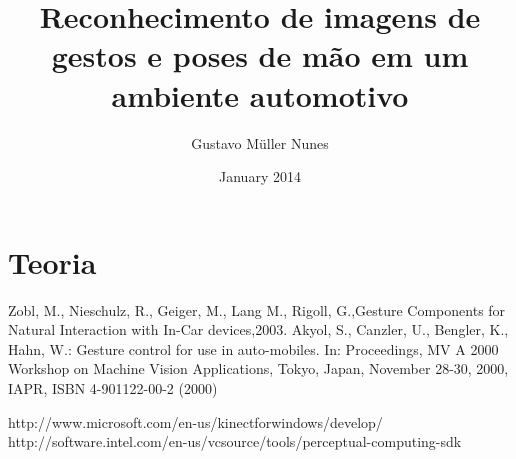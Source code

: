 \documentclass[a4paper,11pt,oneside]{book}
\begin{document}
\author{Gustavo Müller Nunes}
\title{Reconhecimento de imagens de gestos e poses de mão em um ambiente automotivo}
\date{January 2014}

\maketitle
\tableofcontents 	%
\listoftables 		%
\listoffigures 		%


\chapter{Teoria}



\begin{thebibliography}{2}
 
 Zobl, M., Nieschulz, R., Geiger, M., Lang M., Rigoll, G.,{Gesture Components for Natural Interaction with In-Car devices},2003.
 Akyol, S., Canzler, U., Bengler, K., Hahn, W.: Gesture control for use in auto-mobiles. In: Proceedings, MV A 2000 Workshop on Machine Vision Applications, Tokyo, Japan, November 28-30, 2000, IAPR, ISBN 4-901122-00-2 (2000)
 
 http://www.microsoft.com/en-us/kinectforwindows/develop/
http://software.intel.com/en-us/vcsource/tools/perceptual-computing-sdk

\end{thebibliography}
\end{document}

